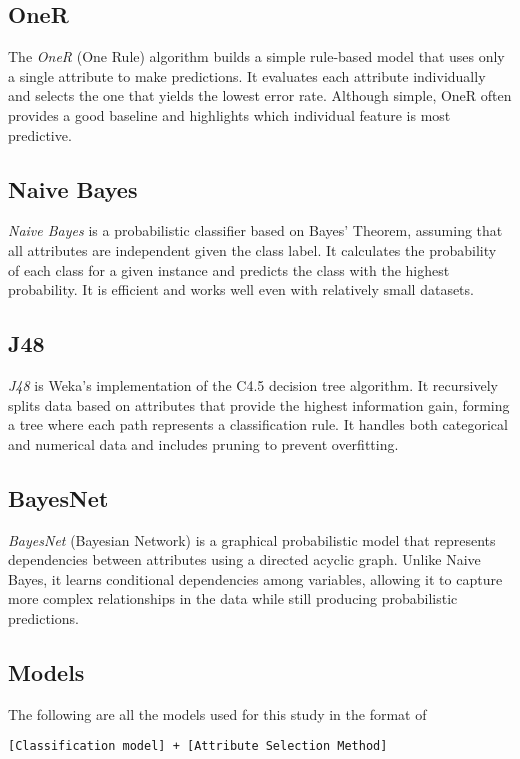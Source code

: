 \documentclass{article}
\begin{document}
\subsection{OneR}
The \textit{OneR} (One Rule) algorithm builds a simple rule-based model that uses only a single attribute to make predictions. 
It evaluates each attribute individually and selects the one that yields the lowest error rate. 
Although simple, OneR often provides a good baseline and highlights which individual feature is most predictive.

\subsection{Naive Bayes}
\textit{Naive Bayes} is a probabilistic classifier based on Bayes’ Theorem, assuming that all attributes are independent given the class label. 
It calculates the probability of each class for a given instance and predicts the class with the highest probability. 
It is efficient and works well even with relatively small datasets.

\subsection{J48}
\textit{J48} is Weka’s implementation of the C4.5 decision tree algorithm. 
It recursively splits data based on attributes that provide the highest information gain, forming a tree where each path represents a classification rule. 
It handles both categorical and numerical data and includes pruning to prevent overfitting.

\subsection{BayesNet}
\textit{BayesNet} (Bayesian Network) is a graphical probabilistic model that represents dependencies between attributes using a directed acyclic graph. 
Unlike Naive Bayes, it learns conditional dependencies among variables, allowing it to capture more complex relationships in the data while still producing probabilistic predictions.

\subsection{Models}
The following are all the models used for this study in the format of

\verb|[Classification model] + [Attribute Selection Method]|
\end{document}
